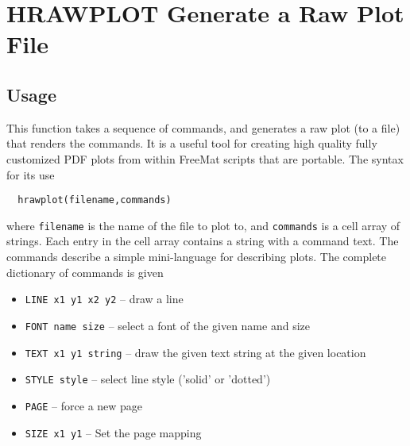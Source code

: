 \section{HRAWPLOT Generate a Raw Plot File}

\subsection{Usage}

This function takes a sequence of commands, and generates
a raw plot (to a file) that renders the commands.  It is 
a useful tool for creating high quality fully customized 
PDF plots from within FreeMat scripts that are portable.  The
syntax for its use 
\begin{verbatim}
  hrawplot(filename,commands)
\end{verbatim}
where \verb|filename| is the name of the file to plot to, 
and \verb|commands| is a cell array of strings.  Each entry in the 
cell array contains a string with a command text.  The
commands describe a simple mini-language for describing
plots.  The complete dictionary of commands is given
\begin{itemize}
\item  \verb|LINE x1 y1 x2 y2| -- draw a line

\item  \verb|FONT name size| -- select a font of the given name and size

\item  \verb|TEXT x1 y1 string| -- draw the given text string at the given location

\item  \verb|STYLE style| -- select line style ('solid' or 'dotted')

\item  \verb|PAGE| -- force a new page

\item  \verb|SIZE x1 y1| -- Set the page mapping

\end{itemize}
